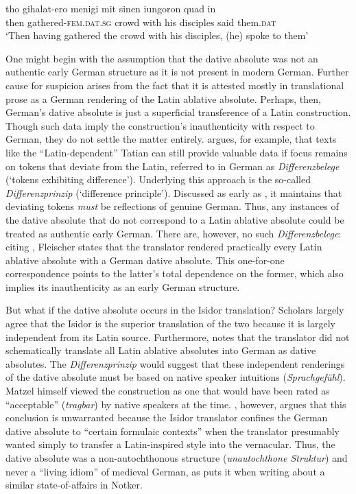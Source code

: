 \gll   tho    gihalat-ero       menigi  mit    sinen  iungoron  quad   in\\
  then  gathered-\textsc{fem.dat.sg}  crowd  with  his    disciples    said    them.\textsc{dat}\\

\glt ‘Then having gathered the crowd with his disciples, (he) spoke to them’
\z

\noindent One might begin with the assumption that the dative absolute was not an authentic early German structure as it is not present in modern German. Further cause for suspicion arises from the fact that it is attested mostly in translational prose as a German rendering of the Latin ablative absolute. Perhaps, then, German’s dative absolute is just a superficial transference of a Latin construction. Though such data imply the construction’s inauthenticity with respect to German, they do not settle the matter entirely. \citet[32--33]{Fleischer2006} argues, for example, that texts like the “Latin-dependent” Tatian can still provide valuable data if focus remains on tokens that deviate from the Latin, referred to in German as \textit{Differenzbelege} (‘tokens exhibiting difference’). Underlying this approach is the so-called \textit{Differenzprinzip} (‘difference principle’). Discussed as early as \citet{Ruhfus1897}, it maintains that deviating tokens \textit{must} be reflections of genuine German. Thus, any instances of the dative absolute that do not correspond to a Latin ablative absolute could be treated as authentic early German. There are, however, no such \textit{Differenzbelege}: citing \citet[179--181]{Lippert1974}, Fleischer states that the translator rendered practically every Latin ablative absolute with a German dative absolute. This one-for-one correspondence points to the latter’s total dependence on the former, which also implies its inauthenticity as an early German structure.

But what if the dative absolute occurs in the Isidor translation? Scholars largely agree that the Isidor is the superior translation of the two because it is largely independent from its Latin source. Furthermore, \citet[349]{Matzel1970} notes that the translator did not schematically translate all Latin ablative absolutes into German as dative absolutes. The \textit{Differenzprinzip} would suggest that these independent renderings of the dative absolute must be based on native speaker intuitions (\textit{Sprachgefühl}). Matzel himself viewed the construction as one that would have been rated as “acceptable” (\textit{tragbar}) by native speakers at the time. \citet[160]{Lippert1974}, however, argues that this conclusion is unwarranted because the Isidor translator confines the German dative absolute to “certain formulaic contexts” when the translator presumably wanted simply to transfer a Latin-inspired style into the vernacular. Thus, the dative absolute was a non-autochthonous structure (\textit{unautochthone Struktur}) and never a “living idiom” of medieval German, as \citet[56]{Gelderen1991} puts it when writing about a similar state-of-affairs in Notker.

